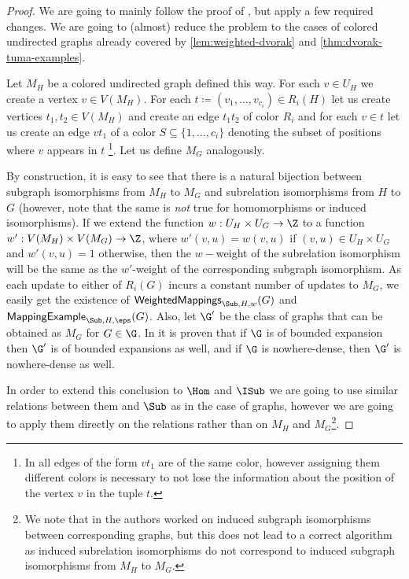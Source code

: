 \begin{proof}
	We are going to mainly follow the proof of \cite{DvorakTumaArxiv}, but apply a few required changes. We are going to (almost) reduce the problem to the cases of colored undirected graphs already covered by \ref{lem:weighted-dvorak} and \ref{thm:dvorak-tuma-examples}.
	
	Let $M_H$ be a colored undirected graph defined this way. For each $v \in U_H$ we create a vertex $v \in V(M_H)$. For each $t \coloneqq (v_1, \ldots, v_{c_i}) \in R_i(H)$ let us create vertices $t_1, t_2 \in V(M_H)$ and create an edge $t_1t_2$ of color $R_i$ and for each $v \in t$ let us create an edge $vt_1$ of a color $S \subseteq \{1, \ldots, c_i\}$ denoting the subset of positions where $v$ appears in $t$ \footnote{In \cite{DvorakTumaArxiv} all edges of the form $vt_1$ are of the same color, however assigning them different colors is necessary to not lose the information about the position of the vertex $v$ in the tuple $t$.}. Let us define $M_G$ analogously. 
	
	By construction, it is easy to see that there is a natural bijection between subgraph isomorphisms from $M_H$ to $M_G$ and subrelation isomorphisms from $H$ to $G$ (however, note that the same is \textit{not} true for homomorphisms or induced isomorphisms). If we extend the function $w : U_H \times U_G \to \Z$ to a function $w' : V(M_H) \times V(M_G) 
	\to \Z$, where $w'(v, u) = w(v, u)$ if $(v, u) \in U_H \times U_G$ and $w'(v, u)=1$ otherwise, then the $w-$weight of the subrelation isomorphism will be the same as the $w'$-weight of the corresponding subgraph isomorphism.
	As each update to either of $R_i(G)$ incurs a constant number of updates to $M_G$, we easily get the existence of $\mathsf{WeightedMappings}_{\Sub, H, w}(G)$ and $\mathsf{MappingExample}_{\Sub, H, \eps}(G)$. Also, let $\G'$ be the class of graphs that can be obtained as $M_G$ for $G \in \G$. In \cite{DvorakTumaArxiv} it is proven that if $\G$ is of bounded expansion then $\G'$ is of bounded expansions as well, and if $\G$ is nowhere-dense, then $\G'$ is nowhere-dense as well.
	
	
	In order to extend this conclusion to $\Hom$ and $\ISub$ we are going to use similar relations between them and $\Sub$ as in the case of graphs, however we are going to apply them directly on the relations rather than on $M_H$ and $M_G$\footnote{We note that in \cite{DvorakTumaArxiv} the authors worked on induced subgraph isomorphisms between corresponding graphs, but this does not lead to a correct algorithm as induced subrelation isomorphisms do not correspond to induced subgraph isomorphisms from $M_H$ to $M_G$.}.
	

\end{proof}
